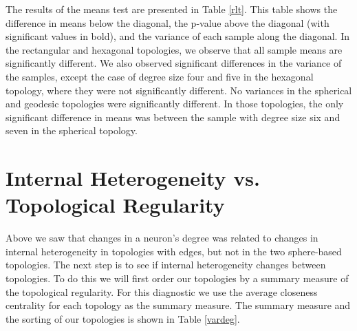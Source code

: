 \begin{table}[hb]
\begin{minipage}{\textwidth}
\end{minipage}\end{table}

The results of the means test are presented in Table \ref{rlt}. This table
shows the difference in means below the diagonal, the p-value above the
diagonal (with significant values in bold), and the variance of each
sample along the diagonal.  In the rectangular and hexagonal topologies, we
observe that all sample means are significantly different.  We also observed
significant differences in the variance of the samples, except the case of
degree size four and five in the hexagonal topology, where they were not
significantly different. No variances in the spherical and geodesic topologies
were significantly different.  In those topologies, the only significant
difference in means was between the sample with degree size six and seven in
the spherical topology.





\section{Internal Heterogeneity vs. Topological Regularity}
\label{rdq2}
Above we saw that changes in a neuron's degree was related to changes in
internal heterogeneity in topologies with edges, but not in the two sphere-based
topologies. The next step is to see if internal heterogeneity changes between
topologies.  To do this we will first order our topologies by a summary
measure of the topological regularity.  For this diagnostic we use the average
closeness centrality for each topology as the summary measure.  The summary
measure and the sorting of our topologies is shown in Table \ref{vardeg}.

